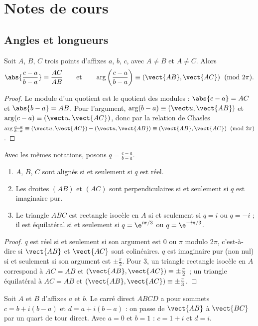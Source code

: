\mxnewpage
\section{Notes de cours}
\subsection{Angles et longueurs}
\begin{theorem}
Soit $A$, $B$, $C$ trois points d'affixes $a$, $b$, $c$, avec $A\neq B$ et $A\neq C$. Alors
\[\abs{\frac{c-a}{b-a}}=\frac{AC}{AB}\qquad\text{et}\qquad\arg\left(\frac{c-a}{b-a}\right)\equiv\left(\vect{AB},\vect{AC}\right)\pmod{2\pi}.\]
\end{theorem}
\begin{proof}
Le module d'un quotient est le quotient des modules : $\abs{c-a}=AC$ et $\abs{b-a}=AB$. Pour l'argument, $\arg(b-a)\equiv\left(\vect u,\vect{AB}\right)$ et $\arg(c-a)\equiv\left(\vect u,\vect{AC}\right)$, donc par la relation de Chasles $\arg\frac{c-a}{b-a}\equiv\left(\vect u,\vect{AC}\right)-\left(\vect u,\vect{AB}\right)\equiv\left(\vect{AB},\vect{AC}\right)\pmod{2\pi}$.
\end{proof}
\begin{theorem}
Avec les mêmes notations, posons $q=\frac{c-a}{b-a}$.
\begin{enumerate}
\item $A$, $B$, $C$ sont alignés si et seulement si $q$ est réel.
\item Les droites $(AB)$ et $(AC)$ sont perpendiculaires si et seulement si $q$ est imaginaire pur.
\item Le triangle $ABC$ est rectangle isocèle en $A$ si et seulement si $q=i$ ou $q=-i$ ; il est équilatéral si et seulement si $q=\e^{i\pi/3}$ ou $q=\e^{-i\pi/3}$.
\end{enumerate}
\end{theorem}
\begin{proof}
$q$ est réel si et seulement si son argument est $0$ ou $\pi$ modulo $2\pi$, c'est-à-dire si $\vect{AB}$ et $\vect{AC}$ sont colinéaires. $q$ est imaginaire pur (non nul) si et seulement si son argument est $\pm\frac\pi2$. Pour 3, un triangle rectangle isocèle en $A$ correspond à $AC=AB$ et $\left(\vect{AB},\vect{AC}\right)\equiv\pm\frac\pi2$ ; un triangle équilatéral à $AC=AB$ et $\left(\vect{AB},\vect{AC}\right)\equiv\pm\frac\pi3$.
\end{proof}
\begin{example}
Soit $A$ et $B$ d'affixes $a$ et $b$. Le carré direct $ABCD$ a pour sommets $c=b+i(b-a)$ et $d=a+i(b-a)$ : on passe de $\vect{AB}$ à $\vect{BC}$ par un quart de tour direct. Avec $a=0$ et $b=1$ : $c=1+i$ et $d=i$.
\end{example}

